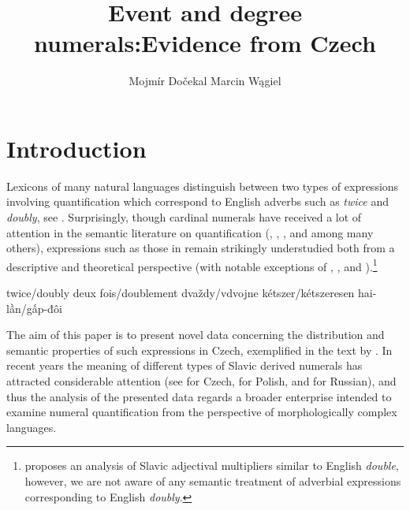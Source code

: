 \documentclass[output=paper,
modfonts,
hidelinks,
newtxmath
]{langscibook}
\title{Event and degree numerals:\newlineCover Evidence from Czech}
\author{
 Mojmír Dočekal\affiliation{Masaryk University in Brno}\lastand
 Marcin Wągiel\affiliation{Masaryk University in Brno}
}
\begin{document}
\maketitle
{}

\section{Introduction}\label{introduction}

Lexicons of many natural languages distinguish between two types of expressions involving quantification which correspond to English adverbs such as \textit{twice} and \textit{doubly}, see . Surprisingly, though cardinal numerals have received a lot of attention in the semantic literature on quantification (\citealt{landman2004indefinites}, \citealt{ionin_composition_2006}, \citealt{hofweber2005number}, and \citealt{rothstein2012numericals} among many others), expressions such as those in  remain strikingly understudied both from a descriptive and theoretical perspective (with notable exceptions of \citealt{landman_indefinite_2006}, \citealt{bhatt2007degree}, and \citealt{donazzan_ways_2013}).\footnote{\citet{wagiel-toappear-entities} proposes an analysis of Slavic adjectival multipliers similar to English \textit{double}, however, we are not aware of any semantic treatment of adverbial expressions corresponding to English \textit{doubly}.}

\ea \label{twice-double-expressions}
\settowidth{}
\ea twice/doubly             
\ex deux fois/doublement 
\ex dvaždy/vdvojne       
\ex kétszer/kétszeresen  
\ex hai-lần/gấp-đôi          
\z
\z

\noindent The aim of this paper is to present novel data concerning the distribution and semantic properties of such expressions in Czech, exemplified in the text by . In recent years the meaning of different types of Slavic derived numerals has attracted considerable attention (see \citealt{docekal2012atoms,docekal2013numerals} for Czech, \citealt{wagiel2014dwoje,wagiel2015sums} for Polish, and \citealt{khrizman2015cardinal} for Russian), and thus the analysis of the presented data regards a broader enterprise intended to examine numeral quantification from the perspective of morphologically complex languages.
\end{document}
